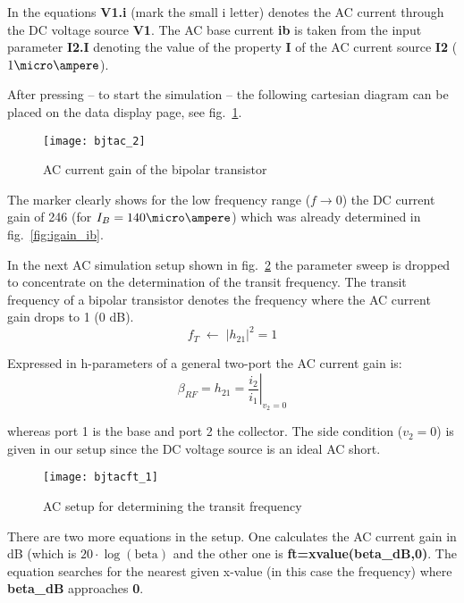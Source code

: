 \medskip

In the equations \textbf{V1.i} (mark the small i letter) denotes the
AC current through the DC voltage source \textbf{V1}.  The AC base
current \textbf{ib} is taken from the input parameter \textbf{I2.I}
denoting the value of the property \textbf{I} of the AC current source
\textbf{I2} ($1\micro\ampere$).

\medskip

After pressing  -- to start the simulation -- the
following cartesian diagram can be placed on the data display page,
see fig.~\ref{fig:bjtac_2}.

\begin{figure}[ht]
  \centering
  \texttt{[image: bjtac\_2]}
  \caption{AC current gain of the bipolar transistor}
  \label{fig:bjtac_2}
\end{figure}
\FloatBarrier

The marker clearly shows for the low frequency range ($f \rightarrow
0$) the DC current gain of 246 (for $I_B = 140\micro\ampere$) which
was already determined in fig.~\ref{fig:igain_ib}.

\medskip

In the next AC simulation setup shown in fig.~\ref{fig:bjtacft_1} the
parameter sweep is dropped to concentrate on the determination of the
transit frequency.  The transit frequency of a bipolar transistor
denotes the frequency where the AC current gain drops to 1 (0 dB).
\begin{equation*}
f_T \; \leftarrow \; \left|h_{21}\right|^2 = 1
\end{equation*}

Expressed in h-parameters of a general two-port the AC current gain
is:
\begin{equation*}
\beta_{RF} = h_{21} = \left.\dfrac{i_2}{i_1}\right|_{v_2=0}
\end{equation*}

whereas port 1 is the base and port 2 the collector.  The side
condition ($v_2=0$) is given in our setup since the DC voltage source
is an ideal AC short.

\begin{figure}[ht]
  \centering
  \texttt{[image: bjtacft\_1]}
  \caption{AC setup for determining the transit frequency}
  \label{fig:bjtacft_1}
\end{figure}
\FloatBarrier

There are two more equations in the setup.  One calculates the AC
current gain in dB (which is $\mathrm{20\cdot\log{\left(beta\right)}}$
and the other one is \textbf{ft=xvalue(beta\_dB,0)}.  The equation
searches for the nearest given x-value (in this case the frequency)
where \textbf{beta\_dB} approaches \textbf{0}.

